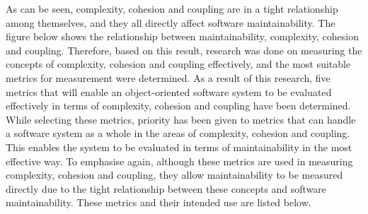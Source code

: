 As can be seen, complexity, cohesion and coupling are in a tight relationship among themselves, and they all directly affect software maintainability. The figure below shows the relationship between maintainability, complexity, cohesion and coupling. Therefore, based on this result, research was done on measuring the concepts of complexity, cohesion and coupling effectively, and the most suitable metrics for measurement were determined. As a result of this research, five metrics that will enable an object-oriented software system to be evaluated effectively in terms of complexity, cohesion and coupling have been determined. While selecting these metrics, priority has been given to metrics that can handle a software system as a whole in the areas of complexity, cohesion and coupling. This enables the system to be evaluated in terms of maintainability in the most effective way. To emphasise again, although these metrics are used in measuring complexity, cohesion and coupling, they allow maintainability to be measured directly due to the tight relationship between these concepts and software maintainability. These metrics and their intended use are listed below. 
